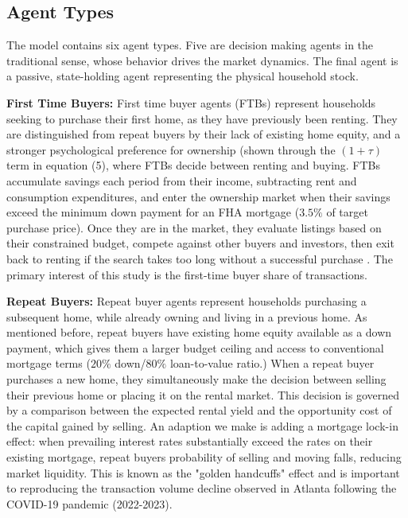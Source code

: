 \documentclass[twocolumn,showpacs,%
  nofootinbib,aps,superscriptaddress,%
  eqsecnum,prd,notitlepage,showkeys,10pt]{revtex4-1}
\begin{document}
\subsection{Agent Types}

The model contains six agent types. Five are decision making agents in the traditional sense, whose behavior drives the market dynamics. The final agent is a passive, state-holding agent representing the physical household stock. \newline

\textbf{First Time Buyers:}
First time buyer agents (FTBs) represent households seeking to purchase their first home, as they have previously been renting. They are distinguished from repeat buyers by their lack of existing home equity, and a stronger psychological preference for ownership (shown through the $(1+\tau)$ term in equation (5), where FTBs decide between renting and buying. FTBs accumulate savings each period from their income, subtracting rent and consumption expenditures, and enter the ownership market when their savings exceed the minimum down payment for an FHA mortgage ($3.5\%$ of target purchase price). Once they are in the market, they evaluate listings based on their constrained budget, compete against other buyers and investors, then exit back to renting if the search takes too long without a successful purchase . The primary interest of this study is the first-time buyer share of transactions. \newline

\textbf{Repeat Buyers:} Repeat buyer agents represent households purchasing a subsequent home, while already owning and living in a previous home. As mentioned before, repeat buyers have existing home equity available as a down payment, which gives them a larger budget ceiling and access to conventional mortgage terms ($20\%$ down/$80\%$ loan-to-value ratio.) When a repeat buyer purchases a new home, they simultaneously make the decision between selling their previous home or placing it on the rental market. This decision is governed by a comparison between the expected rental yield and the opportunity cost of the capital gained by selling. An adaption we make is adding a mortgage lock-in effect: when prevailing interest rates substantially exceed the rates on their existing mortgage, repeat buyers probability of selling and moving falls, reducing market liquidity. This is known as the "golden handcuffs" effect \cite{fonseca2023lockin} and is important to reproducing the transaction volume decline observed in Atlanta following the COVID-19 pandemic (2022-2023). \newline
\end{document}
